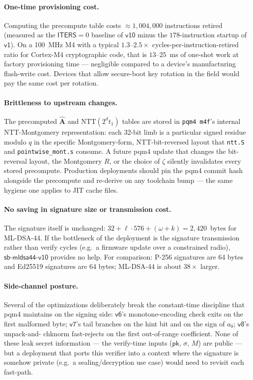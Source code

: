 \documentclass[11pt,a4paper]{article}
\newcommand{\NTT}{\mathrm{NTT}}
\begin{document}
\paragraph{One-time provisioning cost.} Computing the precompute
table costs $\approx 1{,}004{,}000$ instructions retired (measured
as the $\textsf{ITERS}=0$ baseline of $\textsf{v10}$ minus the
$178$-instruction startup of $\textsf{v1}$). On a 100~MHz M4 with a
typical $1.3$--$2.5\times$ cycles-per-instruction-retired ratio for
Cortex-M4 cryptographic code, that is $13$--$25$~ms of one-shot work
at factory provisioning time --- negligible compared to a device's
manufacturing flash-write cost. Devices that allow secure-boot key
rotation in the field would pay the same cost per rotation.

\paragraph{Brittleness to upstream changes.} The precomputed
$\hat{\mathbf{A}}$ and $\NTT(2^d t_1)$ tables are stored in
\texttt{pqm4 m4f}'s internal NTT-Montgomery representation: each
32-bit limb is a particular signed residue modulo $q$ in the
specific Montgomery-form, NTT-bit-reversed layout that
\texttt{ntt.S} and \texttt{pointwise\_mont.s} consume. A future
pqm4 update that changes the bit-reversal layout, the Montgomery
$R$, or the choice of $\zeta$ silently invalidates every stored
precompute. Production deployments should pin
the pqm4 commit hash alongside the precompute and re-derive on any
toolchain bump --- the same hygiene one applies to JIT cache files.

\paragraph{No saving in signature size or transmission cost.} The
signature itself is unchanged: $32 + \ell\cdot 576 + (\omega + k) =
2{,}420$~bytes for ML-DSA-44. If the bottleneck of the deployment
is the signature transmission rather than verify cycles (e.g.\ a
firmware update over a constrained radio), $\textsf{sb-mldsa44-v10}$
provides no help. For comparison: P-256 signatures are 64 bytes and
Ed25519 signatures are 64 bytes; ML-DSA-44 is about $38\times$
larger.

\paragraph{Side-channel posture.} Several of the optimizations
deliberately break the constant-time discipline that pqm4 maintains
on the signing side: $\textsf{v6}$'s monotone-encoding check exits
on the first malformed byte; $\textsf{v7}$'s tail branches on the
hint bit and on the sign of $a_0$; $\textsf{v8}$'s unpack-and-
chknorm fast-rejects on the first out-of-range coefficient. None
of these leak secret information --- the verify-time inputs
($\textsf{pk}$, $\sigma$, $M$) are public --- but a deployment that
ports this verifier into a context where the signature is somehow
private (e.g.\ a sealing/decryption use case) would need to revisit
each fast-path.
\end{document}
